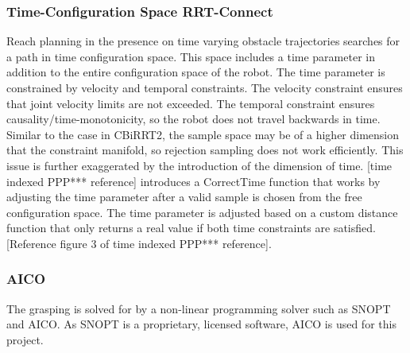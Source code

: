 \documentclass[12pt]{article}
\begin{document}
        \subsubsection{Time-Configuration Space RRT-Connect}
            Reach planning in the presence on time varying obstacle trajectories searches for a path in time configuration space. This space includes a time parameter in addition to the entire configuration space of the robot. The time parameter is constrained by velocity and temporal constraints. The velocity constraint ensures that joint velocity limits are not exceeded. The temporal constraint ensures causality/time-monotonicity, so the robot does not travel backwards in time. Similar to the case in CBiRRT2, the sample space may be of a higher dimension that the constraint manifold, so rejection sampling does not work efficiently. This issue is further exaggerated by the introduction of the dimension of time. [time indexed PPP*** reference] introduces a CorrectTime function that works by adjusting the time parameter after a valid sample is chosen from the free configuration space. The time parameter is adjusted based on a custom distance function that only returns a real value if both time constraints are satisfied. [Reference figure 3 of time indexed PPP*** reference].

        \subsubsection{AICO}
            The grasping is solved for by a non-linear programming solver such as SNOPT and AICO. As SNOPT is a proprietary, licensed software, AICO is used for this project. 
\end{document}
